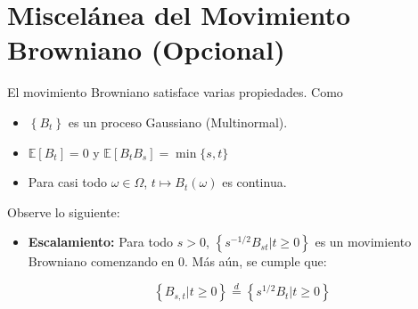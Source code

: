 
\section{Miscelánea del Movimiento Browniano (Opcional)}

El movimiento Browniano satisface varias propiedades. Como

\begin{itemize}
	\item $\left\{ B_t \right\}$ es un proceso Gaussiano (Multinormal).
	\item $\mathbb{E}[B_t] = 0$ y $\mathbb{E}[B_t B_s] = \min\{ s, t \}$
	\item Para casi todo $\omega \in \Omega$, $t \mapsto B_t (\omega)$ es continua.
\end{itemize}


Observe lo siguiente:

\begin{itemize}
	\item \textbf{Escalamiento: } Para todo $s > 0$, $\left\{ s^{-1/2} B_{st} \vert t \geq 0 \right\}$ es un movimiento Browniano comenzando en 0. Más aún, se cumple que:

	\[
		\left\{ B_{s,t} \vert t \geq 0 \right\}  \stackrel{d}{=}  \left\{ s^{1/2} B_t \vert t \geq 0 \right\}
	\]
\end{itemize}

